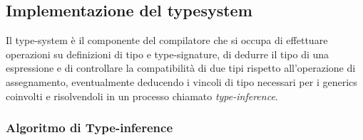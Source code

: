 \subsection{Implementazione del typesystem}
Il type-system è il componente del compilatore che si occupa di effettuare operazioni su definizioni di tipo e 
type-signature, di dedurre il tipo di una espressione e di controllare la compatibilità di due tipi rispetto 
all'operazione di assegnamento, eventualmente deducendo i vincoli di tipo necessari per i generics coinvolti e risolvendoli
in un processo chiamato \textit{type-inference}.





\subsubsection{Algoritmo di Type-inference}